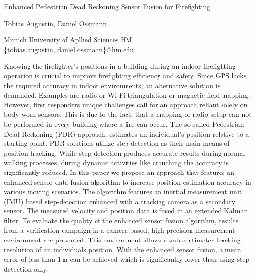 \documentclass[10pt,a4paper]{article}
\begin{document}
	
	\Large
	\begin{center}
		Enhanced Pedestrian Dead Reckoning Sensor Fusion for Firefighting\\ 
		
		\hspace{10pt}
		
		\large
		Tobias Augustin, Daniel Ossmann \\
		
		\hspace{10pt}
		
		\small  
		Munich University of Apllied Sciences HM\\
		\{tobias.augustin, daniel.ossmann\}@hm.edu\\
		
		
	\end{center}
	
	\hspace{10pt}
	
	\normalsize
	
	Knowing the firefighter's positions in a building during an indoor firefighting operation is crucial to improve firefighting efficiency and safety. Since GPS lacks the required accuracy in indoor environments, an alternative solution is demanded. Examples are radio or Wi-Fi triangulation or magnetic field mapping. However, first responders unique challenges call for an approach reliant solely on body-worn sensors. This is due to the fact, that a mapping or radio setup can not be performed in every building where a fire can occur. The so called Pedestrian Dead Reckoning (PDR) approach, estimates an individual's position relative to a starting point. PDR solutions utilize step-detection as their main means of position tracking. While step-detection produces accurate results during normal walking processes, during dynamic activities like crouching the accuracy is significantly reduced. In this paper we propose an approach that features an enhanced sensor data fusion algorithm to increase position estimation accuracy in various moving scenarios. The algorithm features an inertial measurement unit (IMU) based step-detection enhanced with a tracking camera as a secondary sensor. The measured velocity and position data is fused in an extended Kalman filter. To evaluate the quality of the enhanced sensor fusion algorithm, results from a verification campaign in a camera based, high precision measurement environment are presented. This environment allows a sub centimeter tracking resolution of an individuals position. With the enhanced sensor fusion, a mean error of less than $1\,\mathrm{m}$ can be achieved which is significantly lower than using step detection only.
	\vspace{1cm}
	
\end{document}
